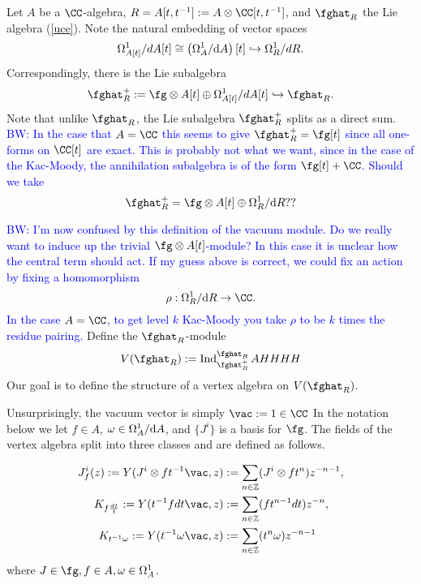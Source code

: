 \documentclass[12pt]{amsart}
\theoremstyle{definition}
\theoremstyle{remark}
\newcommand{\on}{\operatorname}
\newcommand{\R}{R}
\def\d{{\rm d}}
\def\tensor{\otimes}
\def\brian{\textcolor{blue}{BW: }\textcolor{blue}}
\begin{document}


Let $A$ be a $\CC$-algebra, $R=A[t,t^{-1}] := A \otimes \CC[t,t^{-1}]$, and $\fghat_{R}$ the Lie algebra (\ref{uce}). 
Note the natural embedding of vector spaces
\[
\Omega^1_{A[t]}/ d A[t] \cong \left(\Omega^1_A / \d A\right) [t] \hookrightarrow \Omega^{1}_{R} / d R .
\]
Correspondingly, there is the Lie subalgebra 
\[
\fghat^{+}_{R} := \fg \tensor A [t] \oplus \Omega^1_{A[t]}/ d A[t] \hookrightarrow \fghat_R .
\]
Note that unlike $\fghat_R$, the Lie subalgebra $\fghat^+_R$ splits as a direct sum.
\brian{In the case that $A=\CC$ this seems to give $\fghat^+_R = \fg [t]$ since all one-forms on $\CC[t]$ are exact. 
This is probably not what we want, since in the case of the Kac-Moody, the annihilation subalgebra is of the form $\fg[t] + \CC$.
Should we take
\[
\fghat^+_R = \fg \tensor A[t] \oplus \Omega^1_R / \d R ??
\]
}

\brian{I'm now confused by this definition of the vacuum module.
Do we really want to induce up the trivial $\fg \tensor A[t]$-module? In this case it is unclear how the central term should act.
If my guess above is correct, we could fix an action by fixing a homomorphism
\[
\rho : \Omega^1_R / \d R \to \CC .
\]
In the case $A=\CC$, to get level $k$ Kac-Moody you take $\rho$ to be $k$ times the residue pairing.
}
Define the $\fghat_R$-module
\begin{equation}
V(\fghat_{R}) := \on{Ind}^{\fghat_{R}}_{\fghat^+_{R}} AHHHH
\end{equation}
Our goal is to define the structure of a vertex algebra on $V(\fghat_R)$. 

Unsurprisingly, the vacuum vector is simply $\vac := 1 \in \CC$
In the notation below we let $f \in A$, $\omega \in \Omega^1_A / \d A$, and $\{J^i\}$ is a basis for $\fg$. 
The fields of the vertex algebra split into three classes and are defined as follows. 

\begin{align}
J^i_f(z) := Y(J^{i} \otimes f t^{-1} \vac,z ) & := \sum_{n \in \mathbb{Z}} (J^i  \otimes f t^{n}) z^{-n-1}, \\
K_{f \frac{dt}{t}} :=  Y(t^{-1} f dt \vac,z ) & := \sum_{n \in \mathbb{Z}} ( f t^{n-1} dt )  z^{-n}, \\
K_{t^{-1} \omega} := Y(t^{-1}  \omega \vac,z ) & := \sum_{n \in \mathbb{Z}}( t^{n} \omega )    z^{-n-1} \\
\end{align}
where $J\in \fg, f \in A, \omega \in \Omega^{1}_A$. 
\end{document}
